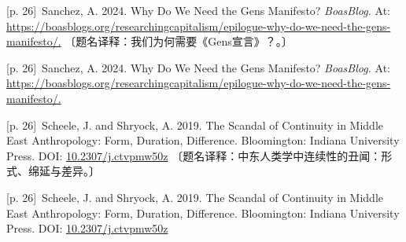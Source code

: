 \documentclass[10pt,a4paper]{article}
\begin{document}
\noindent\begin{minipage}{\textwidth}\begin{minipage}[t]{\dimexpr.5\textwidth-4mm\relax}\noindent\begin{minipage}[t]{\linewidth}{\scriptsize\color{gray} [p. 26]}\ Sanchez, A. 2024. Why Do We Need the Gens Manifesto? \textit{BoasBlog.} At: \url{https://boasblogs.org/researchingcapitalism/epilogue-why-do-we-need-the-gens-manifesto/.} 〔题名译释：我们为何需要《Gens宣言》？。〕\par\end{minipage}\par\end{minipage}\hfill\begin{minipage}[t]{\dimexpr.5\textwidth-4mm\relax}\noindent\begin{minipage}[t]{\linewidth}{\scriptsize\color{gray} [p. 26]}\ Sanchez, A. 2024. Why Do We Need the Gens Manifesto? \textit{BoasBlog.} At: \url{https://boasblogs.org/researchingcapitalism/epilogue-why-do-we-need-the-gens-manifesto/.}\par\end{minipage}\par\end{minipage}\end{minipage}\par
\noindent\begin{minipage}{\textwidth}\begin{minipage}[t]{\dimexpr.5\textwidth-4mm\relax}\noindent\begin{minipage}[t]{\linewidth}{\scriptsize\color{gray} [p. 26]}\ Scheele, J. and Shryock, A. 2019. The Scandal of Continuity in Middle East Anthropology: Form, Duration, Difference. Bloomington: Indiana University Press. DOI: \url{10.2307/j.ctvpmw50z} 〔题名译释：中东人类学中连续性的丑闻：形式、绵延与差异。〕\par\end{minipage}\par\end{minipage}\hfill\begin{minipage}[t]{\dimexpr.5\textwidth-4mm\relax}\noindent\begin{minipage}[t]{\linewidth}{\scriptsize\color{gray} [p. 26]}\ Scheele, J. and Shryock, A. 2019. The Scandal of Continuity in Middle East Anthropology: Form, Duration, Difference. Bloomington: Indiana University Press. DOI: \url{10.2307/j.ctvpmw50z}\par\end{minipage}\par\end{minipage}\end{minipage}\par
\end{document}
